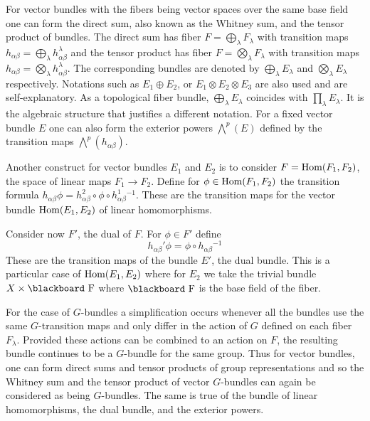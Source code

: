 \documentclass[12pt,titlepage]{article}
\def\bbf#1{\hbox{\blackboard #1}}
\def\lF{\bbf F}
\def\Hom{\hbox{Hom}}
\begin{document}
For vector bundles with the fibers being vector spaces over the same base
field  one can form the direct sum, also known as the
Whitney sum, and the tensor product of bundles. The direct sum has fiber
\(F=\bigoplus_\lambda F_\lambda\) with transition maps \(h_{\alpha\beta}=
{\bigoplus}_\lambda
h^\lambda_{\alpha\beta}\) and the tensor product has fiber
\(F=\bigotimes_\lambda F_\lambda\) with transition maps \(h_{\alpha\beta}=
{\bigotimes}_\lambda
h^\lambda_{\alpha\beta}\). The corresponding bundles are denoted by
\(\bigoplus_\lambda E_\lambda\) and
\(\bigotimes_\lambda E_\lambda\) respectively. Notations such as
\(E_1\oplus E_2\), or \(E_1\otimes E_2\otimes E_3\) are also used and
are self-explanatory. As a topological fiber bundle,  
\(\bigoplus_\lambda E_\lambda\) 
coincides with \(\prod_\lambda E_\lambda\). It is the algebraic structure 
that justifies a different notation. For a fixed vector bundle \(E\) one
can also form the exterior powers \(\bigwedge^p(E)\) defined by the
transition maps \(\bigwedge^p(h_{\alpha\beta})\). 


Another construct for vector bundles \(E_1\) and \(E_2\) is to consider
\(F=\Hom (F_1,F_2)\), the space of linear maps \(F_1\to F_2\). Define
for \(\phi\in\Hom (F_1,F_2)\) the transition formula
\(h_{\alpha\beta}\phi = 
h^2_{\alpha\beta}\circ\phi\circ h^1_{\alpha\beta}{}^{-
1}\). These are the transition maps for the vector bundle
\(\Hom(E_1,E_2)\) of linear homomorphisms.


Consider now
\(F'\), the dual of  \(F\).
For \(\phi\in F'\) define
\begin{equation}\label{eq:trandual}
h_{\alpha\beta}'\phi = \phi\circ h_{\alpha\beta}{}^{-1}
\end{equation}%
These are the
transition maps of the bundle \(E'\), the dual bundle. This is a
particular case of \(\Hom(E_1,E_2)\) where for \(E_2\) we take the
trivial bundle \(X\times \lF\) where \(\lF\) is the base field of the
fiber.


For the case of \(G\)-bundles a simplification occurs whenever all the
bundles use the same \(G\)-transition maps and only differ in the
action of \(G\) defined on each fiber \(F_\lambda\).
Provided these actions can
be combined to an action on \(F\), the resulting bundle continues to be
a \(G\)-bundle for the same group. Thus for vector bundles, one can form
direct sums and tensor products of group representations and so the
Whitney sum and the tensor product of vector \(G\)-bundles can again
be considered as being
\(G\)-bundles. The same is true of the bundle of linear homomorphisms,
the dual bundle, and the exterior powers.
\end{document}
